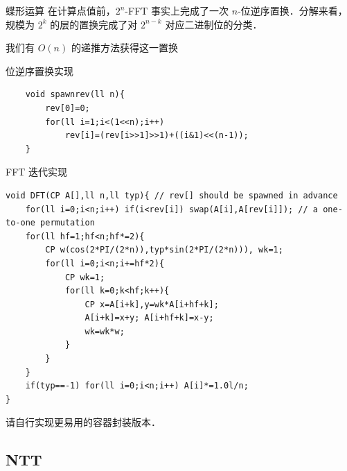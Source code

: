 \documentclass[fontset=fandol]{ctexbeamer}
\begin{document}
\begin{frame}[fragile]{蝶形运算}
在计算点值前，$2^n$-FFT 事实上完成了一次 $n$-位逆序置换．分解来看，规模为 $2^k$ 的层的置换完成了对 $2^{n-k}$ 对应二进制位的分类．

我们有 $O(n)$ 的递推方法获得这一置换
\begin{block}{位逆序置换实现}
{
\begin{verbatim}
    void spawnrev(ll n){
        rev[0]=0;
        for(ll i=1;i<(1<<n);i++)
            rev[i]=(rev[i>>1]>>1)+((i&1)<<(n-1));
    }
\end{verbatim}
}
\end{block}

\end{frame}

\begin{frame}[fragile]{FFT 迭代实现}

{ \scriptsize
\begin{verbatim}
void DFT(CP A[],ll n,ll typ){ // rev[] should be spawned in advance
    for(ll i=0;i<n;i++) if(i<rev[i]) swap(A[i],A[rev[i]]); // a one-to-one permutation
    for(ll hf=1;hf<n;hf*=2){
        CP w(cos(2*PI/(2*n)),typ*sin(2*PI/(2*n))), wk=1;
        for(ll i=0;i<n;i+=hf*2){
            CP wk=1;
            for(ll k=0;k<hf;k++){
                CP x=A[i+k],y=wk*A[i+hf+k];
                A[i+k]=x+y; A[i+hf+k]=x-y;
                wk=wk*w;
            }
        }
    }
    if(typ==-1) for(ll i=0;i<n;i++) A[i]*=1.0l/n;
}
\end{verbatim}
}

请自行实现更易用的容器封装版本．

\end{frame}

\subsection{NTT}
\end{document}
